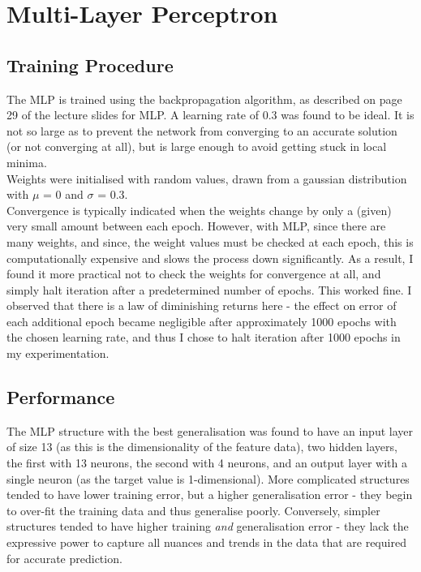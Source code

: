 \documentclass{article}
\begin{document}
\section*{Multi-Layer Perceptron}
\subsection*{Training Procedure}
\noindent The MLP is trained using the backpropagation algorithm, as described on page 29 of the lecture slides for MLP. A learning rate of 0.3 was found to be ideal. It is not so large as to prevent the network from converging to an accurate solution (or not converging at all), but is large enough to avoid getting stuck in local minima. \\
\indent Weights were initialised with random values, drawn from a gaussian distribution with $\mu$ = 0 and $\sigma$ = 0.3. \\
\indent Convergence is typically indicated when the weights change by only a (given) very small amount between each epoch. However, with MLP, since there are many weights, and since, the weight values must be checked at each epoch, this is computationally expensive and slows the process down significantly. As a result, I found it more practical not to check the weights for convergence at all, and simply halt iteration after a predetermined number of epochs. This worked fine. I observed that there is a law of diminishing returns here - the effect on error of each additional epoch became negligible after approximately 1000 epochs with the chosen learning rate, and thus I chose to halt iteration after 1000 epochs in my experimentation.
\subsection*{Performance}
\noindent The MLP structure with the best generalisation was found to have an input layer of size 13 (as this is the dimensionality of the feature data), two hidden layers, the first with 13 neurons, the second with 4 neurons, and an output layer with a single neuron (as the target value is 1-dimensional). More complicated structures tended to have lower training error, but a higher generalisation error - they begin to over-fit the training data and thus generalise poorly. Conversely, simpler structures tended to have higher training \emph{and} generalisation error - they lack the expressive power to capture all nuances and trends in the data that are required for accurate prediction.
\end{document}
